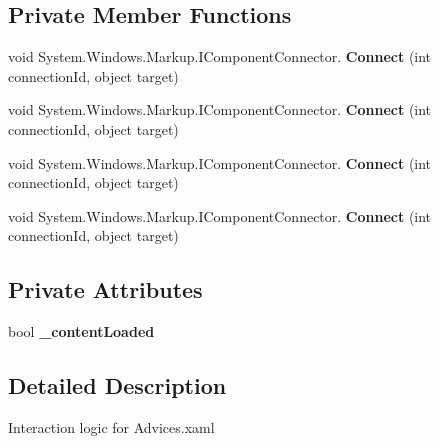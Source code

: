 \subsection*{Private Member Functions}
\begin{DoxyCompactItemize}
\item 
\mbox{\label{class_t_h_b___plugin___social_1_1_advices_1_1_page_a47cd5faf85e3db9d9474286dac0e348c}} 
void System.\+Windows.\+Markup.\+I\+Component\+Connector. {\bfseries Connect} (int connection\+Id, object target)
\item 
\mbox{\label{class_t_h_b___plugin___social_1_1_advices_1_1_page_a47cd5faf85e3db9d9474286dac0e348c}} 
void System.\+Windows.\+Markup.\+I\+Component\+Connector. {\bfseries Connect} (int connection\+Id, object target)
\item 
\mbox{\label{class_t_h_b___plugin___social_1_1_advices_1_1_page_a47cd5faf85e3db9d9474286dac0e348c}} 
void System.\+Windows.\+Markup.\+I\+Component\+Connector. {\bfseries Connect} (int connection\+Id, object target)
\item 
\mbox{\label{class_t_h_b___plugin___social_1_1_advices_1_1_page_a47cd5faf85e3db9d9474286dac0e348c}} 
void System.\+Windows.\+Markup.\+I\+Component\+Connector. {\bfseries Connect} (int connection\+Id, object target)
\end{DoxyCompactItemize}
\subsection*{Private Attributes}
\begin{DoxyCompactItemize}
\item 
\mbox{\label{class_t_h_b___plugin___social_1_1_advices_1_1_page_af8ed0436eabf2c5a5de92040af0d2ccc}} 
bool {\bfseries \+\_\+content\+Loaded}
\end{DoxyCompactItemize}


\subsection{Detailed Description}
Interaction logic for Advices.\+xaml 

